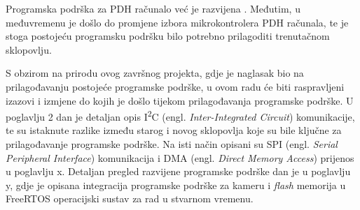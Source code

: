 Programska podrška za PDH računalo već je razvijena \cite{diplomski_goran_petrak}. Međutim, u međuvremenu je došlo do promjene izbora mikrokontrolera PDH računala, te je stoga postojeću programsku podršku bilo potrebno prilagoditi trenutačnom sklopovlju.

S obzirom na prirodu ovog završnog projekta, gdje je naglasak bio na prilagođavanju postojeće programske podrške, u ovom radu će biti raspravljeni izazovi i izmjene do kojih je došlo tijekom prilagođavanja programske podrške. U poglavlju 2 dan je detaljan opis I\textsuperscript{2}C (engl. \textit{Inter-Integrated Circuit}) komunikacije, te su istaknute razlike između starog i novog sklopovlja koje su bile ključne za prilagođavanje programske podrške. Na isti način opisani su SPI (engl. \textit{Serial Peripheral Interface}) komunikacija i DMA (engl. \textit{Direct Memory Access}) prijenos u poglavlju x. Detaljan pregled razvijene programske podrške dan je u poglavlju y, gdje je opisana integracija programske podrške za kameru i \textit{flash} memorija u FreeRTOS operacijski sustav za rad u stvarnom vremenu.
